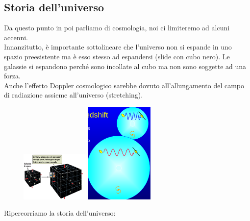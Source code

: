 \documentclass[a4paper,11pt]{article}
\begin{document}
\subsection{Storia dell'universo}
Da questo punto in poi parliamo di cosmologia, noi ci limiteremo ad alcuni accenni. \\
Innanzitutto, è importante sottolineare che l'universo non si espande in uno spazio preesistente ma è esso stesso ad espandersi (slide con cubo nero). Le galassie si espandono perché sono incollate al cubo ma non sono soggette ad una forza. \\
Anche l'effetto Doppler cosmologico sarebbe dovuto all'allungamento del campo di radiazione assieme all'universo (stretching). \\
\begin{figure}[h!!]
        \centering
        \includegraphics[width=0.3\textwidth]{immagini16dic/cubonero.png}
        \includegraphics[width=0.3\textwidth]{immagini16dic/waveshift.png}
        \label{}
    \end{figure}
 \newline
Ripercorriamo la storia dell'universo:
\end{document}
